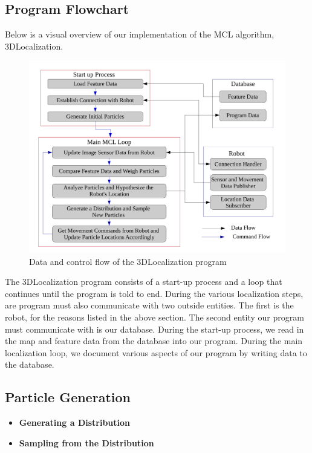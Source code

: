 \documentclass[a4paper,11pt]{article}
\begin{document}
 \subsection{Program Flowchart}
  Below is a visual overview of our implementation of the MCL algorithm, 3DLocalization.
  \begin{figure}[h!]
   \centering
     \includegraphics[width=\textwidth]{../Artifacts/FlowChart}
 \caption{Data and control flow of the 3DLocalization program}
\end{figure}

The 3DLocalization program consists of a start-up process and a loop that continues until the program is told to end. During the various localization steps, are program must also communicate with two outside entities. The first is the robot, for the reasons listed in the above section. The second entity our program must communicate with is our database. During the start-up process, we read in the map and feature data from the database into our program. During the main localization loop, we document various aspects of our program by writing data to the database. 




\subsection{Particle Generation}
\begin{itemize}
  \item \textbf{Generating a Distribution}
  \item \textbf{Sampling from the Distribution}
\end{itemize}
\end{document}
